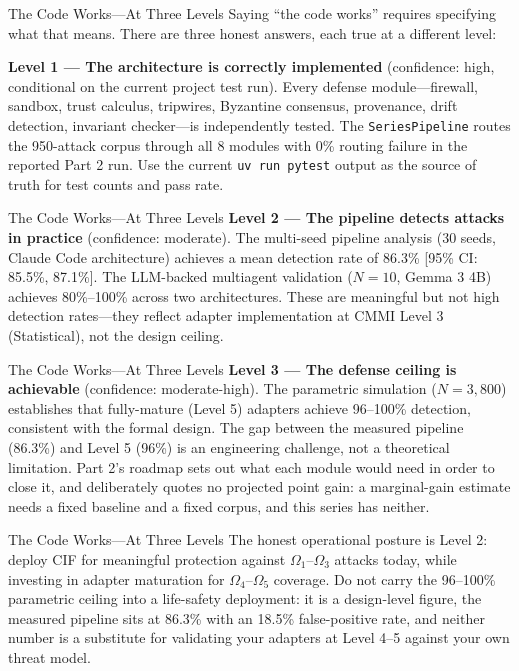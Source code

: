 \documentclass[
  ignorenonframetext,
]{beamer}
\begin{document}
\begin{frame}{The Code Works---At Three
Levels}
\protect{}\label{the-code-worksat-three-levels}
Saying ``the code works'' requires specifying what that means. There are
three honest answers, each true at a different level:

\textbf{Level 1 --- The architecture is correctly implemented}
(confidence: high, conditional on the current project test run). Every
defense module---firewall, sandbox, trust calculus, tripwires, Byzantine
consensus, provenance, drift detection, invariant checker---is
independently tested. The \texttt{SeriesPipeline} routes the 950-attack
corpus through all 8 modules with 0\% routing failure in the reported
Part 2 run. Use the current \texttt{uv\ run\ pytest} output as the
source of truth for test counts and pass rate.

\end{frame}

\begin{frame}{The Code Works---At Three
Levels}
\textbf{Level 2 --- The pipeline detects attacks in practice}
(confidence: moderate). The multi-seed pipeline analysis (30 seeds,
Claude Code architecture) achieves a mean detection rate of 86.3\%
{[}95\% CI: 85.5\%, 87.1\%{]}. The LLM-backed multiagent validation
(\(N=10\), Gemma 3 4B) achieves 80\%--100\% across two architectures.
These are meaningful but not high detection rates---they reflect adapter
implementation at CMMI Level 3 (Statistical), not the design ceiling.

\end{frame}

\begin{frame}{The Code Works---At Three
Levels}
\textbf{Level 3 --- The defense ceiling is achievable} (confidence:
moderate-high). The parametric simulation (\(N=3{,}800\)) establishes
that fully-mature (Level 5) adapters achieve 96--100\% detection,
consistent with the formal design. The gap between the measured pipeline
(86.3\%) and Level 5 (96\%) is an engineering challenge, not a
theoretical limitation. Part 2's roadmap sets out what each module would
need in order to close it, and deliberately quotes no projected point
gain: a marginal-gain estimate needs a fixed baseline and a fixed
corpus, and this series has neither.

\end{frame}

\begin{frame}{The Code Works---At Three
Levels}
The honest operational posture is Level 2: deploy CIF for meaningful
protection against \(\Omega_1\)--\(\Omega_3\) attacks today, while
investing in adapter maturation for \(\Omega_4\)--\(\Omega_5\) coverage.
Do not carry the 96--100\% parametric ceiling into a life-safety
deployment: it is a design-level figure, the measured pipeline sits at
86.3\% with an 18.5\% false-positive rate, and neither number is a
substitute for validating your adapters at Level 4--5 against your own
threat model.
\end{frame}
\end{document}

